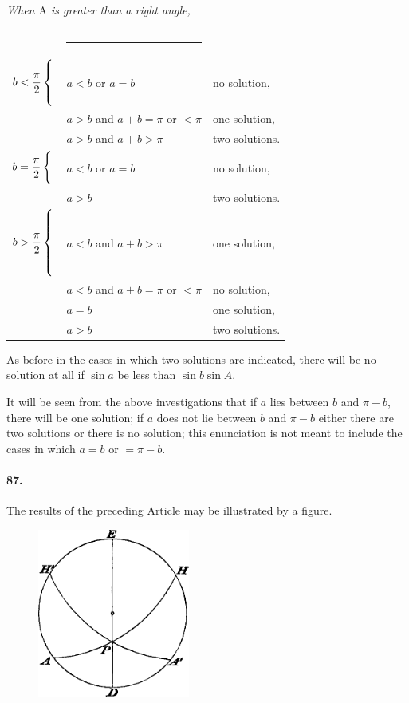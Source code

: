 \documentclass{book}[2004/02/16]
\providecommand{\multirow}[3]{#3}
\begin{document}
\begin{mainmatter}
\begin{spacing}{1.3}
\textit{When $\mathrm A$ is greater than a right angle,}

\begin{longtable}{@{}l@{}l@{}l}
& \rule{.6\textwidth}{0pt} \\[-1ex]
\multirow{3}{*}{$b < \dfrac{\pi}{2} \left\{\rule{0pt}{5.5ex}\right.$}
& $a < b$ or $a = b$ \dotfill& no solution,\\*
& $a > b$ and $a + b = \pi$ or ${}<\pi$ \dotfill& one solution,\\*
& $a > b$ and $a + b > \pi$ \dotfill& two solutions.
\\[2ex]
\multirow{2}{*}{$b = \dfrac{\pi}{2} \left\{\rule{0pt}{4ex}\right.$}
& $a < b$ or $a = b$ \dotfill& no solution, \\*
& $a > b$ \dotfill& two solutions.
\\[2ex]
\multirow{4}{*}{$b > \dfrac{\pi}{2} \left\{\rule{0pt}{7.5ex}\right.$}
& $a < b$ and $a + b > \pi$ \dotfill& one solution, \\*
& $a < b$ and $a + b = \pi$ or ${}<\pi$ \dotfill& no solution, \\*
& $a = b$ \dotfill& one solution, \\*
& $a > b$ \dotfill& two solutions.
\end{longtable}\medskip

As before in the cases in which two solutions are indicated,
there will be no solution at all if $\sin a$ be less than
$\sin b \sin A$.

It will be seen from the above investigations that if $a$ lies
between $b$ and $\pi-b$, there will be one solution; if $a$ does not lie
between $b$ and $\pi - b$ either there are two solutions or there is
no solution; this enunciation is not meant to include the cases in
which $a = b$ or $= \pi - b$.

\paragraph{87.} The results of the preceding Article may be illustrated by
a figure.
\begin{figure}[htp]
\centering
\includegraphics[width=5.0cm]{images/067fc}
\end{figure}


\end{spacing}
\end{mainmatter}
\end{document}
